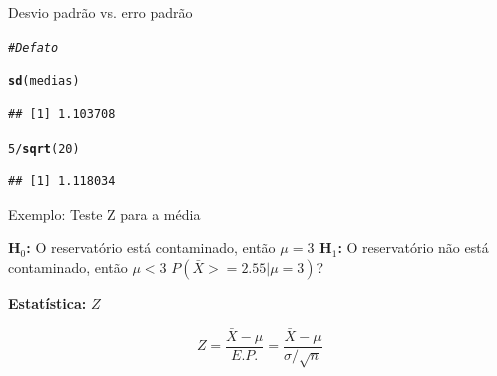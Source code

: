 \documentclass{beamer}\usepackage[]{graphicx}\usepackage[]{color}
\makeatletter
\newcommand{\hlnum}[1]{\textcolor[rgb]{0.686,0.059,0.569}{#1}}%
\newcommand{\hlcom}[1]{\textcolor[rgb]{0.678,0.584,0.686}{\textit{#1}}}%
\newcommand{\hlopt}[1]{\textcolor[rgb]{0,0,0}{#1}}%
\newcommand{\hlstd}[1]{\textcolor[rgb]{0.345,0.345,0.345}{#1}}%
\newcommand{\hlkwd}[1]{\textcolor[rgb]{0.737,0.353,0.396}{\textbf{#1}}}%
\newenvironment{kframe}{%
 \def\at@end@of@kframe{}%
 \ifinner\ifhmode%
  \def\at@end@of@kframe{\end{minipage}}%
  \begin{minipage}{\columnwidth}%
 \fi\fi%
 \def\FrameCommand##1{\hskip\@totalleftmargin \hskip-\fboxsep
 \colorbox{shadecolor}{##1}\hskip-\fboxsep
     \hskip-\linewidth \hskip-\@totalleftmargin \hskip\columnwidth}%
 \MakeFramed {\advance\hsize-\width
   \@totalleftmargin\z@ \linewidth\hsize
   \@setminipage}}%
 {\par\unskip\endMakeFramed%
 \at@end@of@kframe}
\newenvironment{knitrout}{}{} %
\renewenvironment{knitrout}{\setlength{\topsep}{0mm}}{}
\makeatother
\begin{document}
\begin{frame}[fragile]{Desvio padrão vs. erro padrão}


\begin{knitrout}\scriptsize
{}\color{fgcolor}\begin{kframe}
\begin{alltt}
\hlcom{# De fato}

\hlkwd{sd}\hlstd{(medias)}
\end{alltt}
\begin{verbatim}
## [1] 1.103708
\end{verbatim}
\begin{alltt}
\hlnum{5}\hlopt{/}\hlkwd{sqrt}\hlstd{(}\hlnum{20}\hlstd{)}
\end{alltt}
\begin{verbatim}
## [1] 1.118034
\end{verbatim}
\end{kframe}
\end{knitrout}

\end{frame} 


\begin{frame}{Exemplo: Teste Z para a média}

\textbf{H$_0$:} O reservatório está contaminado, então $\mu = 3$
\vfill
\textbf{H$_1$:} O reservatório não está contaminado, então $\mu < 3$
\vfill
$P(\bar{X} >= 2.55 | \mu = 3)$?
\vfill

\textbf{Estatística:} $Z$

\vfill

\begin{equation*}
    Z = \frac{\bar{X} - \mu}{E.P.} = \frac{\bar{X} - \mu}{\sigma / \sqrt{n}}
\end{equation*}

\vfill


\end{frame} 
\end{document}
